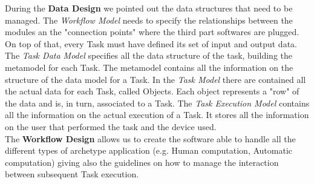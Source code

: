 During the \textbf{Data Design} we pointed out the data structures that
need to be managed. The \emph{Workflow Model} needs to specify the relationships
between the modules an the "connection points" where the third part softwares
are plugged. On top of that, every Task must have defined its set of input and
output data.
The \emph{Task Data Model} specifies all the data structure of the task, building
the metamodel for each Task. The metamodel contains all the information on the 
structure of the data model for a Task.
In the \emph{Task Model} there are contained all the actual data for each Task, called
Objects. Each object represents a "row" of the data and is, in turn,
associated to a Task.
The \emph{Task Execution Model} contains all the information on the actual
execution of a Task. It stores all the information on the user that performed the task and
the device used.\\

The \textbf{Workflow Design} allows us to create the software able to handle all
the different types of archetype application (e.g. Human computation, Automatic
computation) giving also the guidelines on how to manage the interaction between
subsequent Task execution.